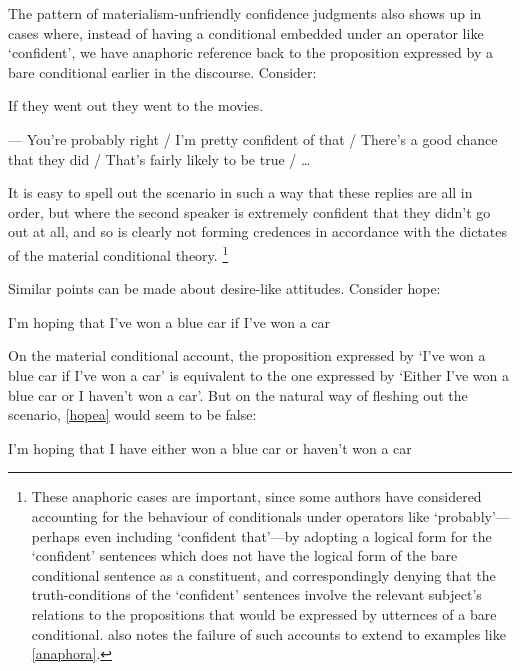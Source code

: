 \documentclass[If.tex]{subfiles}
\begin{document}
The pattern of materialism-unfriendly confidence judgments also shows up in cases where, instead of having a conditional embedded under an operator like ‘confident’, we have anaphoric reference back to the proposition expressed by a bare conditional earlier in the discourse.  Consider:
\begin{prop}
	\nitem \label{anaphora}
	If they went out they went to the movies.  
	
	--- You're probably right / I'm pretty confident of that / There's a good chance that they did / That's fairly likely to be true / … %
\end{prop}
It is easy to spell out the scenario in such a way that these replies are all in order, but where the second speaker is extremely confident that they didn't go out at all, and so is clearly not forming credences in accordance with the dictates of the material conditional theory.%
\footnote{These anaphoric cases are important, since some authors \citep{KratzerConditionals,RothschildNCR} have considered accounting for the behaviour of conditionals under operators like ‘probably’---perhaps even including ‘confident that’---by adopting a logical form for the ‘confident’ sentences which does not have the logical form of the bare conditional sentence as a constituent, and correspondingly denying that the truth-conditions of the ‘confident’ sentences involve the relevant subject's relations to the propositions that would be expressed by utternces of a bare conditional.  \citet{vonFintelIf, vonFintelConditionals} also notes the failure of such accounts to extend to examples like \ref{anaphora}.}  

Similar points can be made about desire-like attitudes.  Consider hope:
\begin{prop}
	\nitem \label{hopeblue}
	I'm hoping that I've won a blue car if I've won a car
\end{prop}
On the material conditional account, the proposition expressed by ‘I've won a blue car if I've won a car’ is equivalent to the one expressed by ‘Either I've won a blue car or I haven't won a car’.  But on the natural way of fleshing out the scenario, \ref{hopea} would seem to be false:
\begin{prop}
	\nitem \label{hopea}
	I'm hoping that I have either won a blue car or haven't won a car	
\end{prop}
\begin{comment}
	We can sharpen the point by assuming it's part of the speaker's background knowledge that the cars on offer are red and blue.  Then, given the plausible assumption that hope is closed under substitution of propositions that are equivalent relative to such background knowledge, \ref{hopeb} stands or falls with \ref{hopea}:
	\begin{prop}
		\nitem \label{hopeb}
		I'm hoping that I didn't win a red car
	\end{prop}
	Forming pro-attitudes in accordance with the material conditional theory would thus involve patterns of hopes (and presumably other pro-attitudes) that are quite out of step with the patterns we actually seem to see, even amongst apparently rational people.  
\end{comment}
\end{document}
